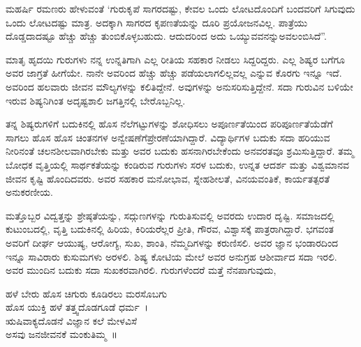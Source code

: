 {ಮಹರ್ಷಿ ರಮಣರು ಹೇಳುವಂತೆ ‘ಗುರುಕೃಪೆ ಸಾಗರದಷ್ಟು, ಕೇವಲ ಒಂದು ಲೋಟದೊಂದಿಗೆ ಬಂದವರಿಗೆ ಸಿಗುವುದು ಒಂದು ಲೋಟದಷ್ಟು ಮಾತ್ರ. ಅದಕ್ಕಾಗಿ ಸಾಗರದ ಕೃಪಣತೆಯನ್ನು ದೂರಿ ಪ್ರಯೋಜನವಿಲ್ಲ. ಪಾತ್ರೆಯು ದೊಡ್ಡದಾದಷ್ಟೂ ಹೆಚ್ಚು ಹೆಚ್ಚು ತುಂಬಿಕೊಳ್ಳಬಹುದು. ಆದುದರಿಂದ ಅದು ಒಯ್ಯುವವನನ್ನು\break ಅವಲಂಬಿಸಿದೆ”.

ಮಾತೃ ಹೃದಯಿ ಗುರುಗಳು ನನ್ನ ಉನ್ನತಿಗಾಗಿ ಎಲ್ಲ ರೀತಿಯ ಸಹಕಾರ ನೀಡಲು ಸಿದ್ದರಿದ್ದರು. ಎಲ್ಲ ಶಿಷ್ಯರ ಬಗೆಗೂ ಅವರ ಜಾಗ್ರತೆ ಹೀಗೆಯೇ. ನಾನೇ ಅವರಿಂದ ಹೆಚ್ಚು ಹೆಚ್ಚು ಪಡೆಯಲಾಗಲಿಲ್ಲವಲ್ಲ ಎನ್ನುವ ಕೊರಗು ಇನ್ನೂ ಇದೆ. ಅವರಿಂದ ಹಲವಾರು ಜೀವನ ಮೌಲ್ಯಗಳನ್ನು ಕಲಿತಿದ್ದೇನೆ. ಅವುಗಳನ್ನು ಅನುಸರಿಸುತ್ತಿದ್ದೇನೆ. ಸದಾ ಗುರುವಿನ ಬಳಿಯೇ ಇರುವ ಶಿಷ್ಯನಿಗಿಂತ ಅದೃಷ್ಟಶಾಲಿ ಜಗತ್ತಿನಲ್ಲಿ ಬೇರೊಬ್ಬನಿಲ್ಲ.

ತನ್ನ ಶಿಷ್ಯರುಗಳಿಗೆ ಬದುಕಿನಲ್ಲಿ ಹೊಸ ನೆಲೆಗಟ್ಟುಗಳನ್ನು ಶೋಧಿಸಲು ಅಪೂರ್ಣತೆ\-ಯಿಂದ ಪರಿಪೂರ್ಣತೆಯೆಡೆಗೆ ಸಾಗಲು ಹೊಸ ಹೊಸ ಚಿಂತನಗಳ ಅನ್ವೇಷಣೆಗೆ\break ಪ್ರೇರಣೆಯಾಗಿದ್ದಾರೆ. ವಿದ್ಯಾರ್ಥಿಗಳ ಬದುಕು ಸದಾ ಹರಿಯುವ ನೀರಿನಂತೆ ಚಲನಶೀಲ\-ವಾಗಿರಬೇಕು ಮತ್ತು ಅವರ ಬದುಕು ಹಸನಾಗಿರಬೇಕೆಂದು ಅನವರತವೂ ಶ್ರಮಿಸುತ್ತಿದ್ದಾರೆ. ತಮ್ಮ ಬೋಧಕ ವೃತ್ತಿಯಲ್ಲಿ ಸಾರ್ಥಕತೆಯನ್ನು ಕಂಡಿರುವ ಗುರುಗಳು ಸರಳ ಬದುಕು, ಉನ್ನತ ಆದರ್ಶ ಮತ್ತು ವಿಶ್ವಮಾನವ ಜೀವನ ಕೃಷ್ಟಿ ಹೊಂದಿದವರು. ಅವರ ಸಹಕಾರ ಮನೋಭಾವ, ಸ್ನೇಹಶೀಲತೆ, ವಿನಯವಂತಿಕೆ, ಕಾರ್ಯತತ್ಪರತೆ ಅನುಕರಣೀಯ.

ಮತ್ತೊಬ್ಬರ ವಿದ್ವತ್ತನ್ನು ಶ್ರೇಷ್ಠತೆಯನ್ನು, ಸದ್ಗುಣಗಳನ್ನು ಗುರುತಿಸುವಲ್ಲಿ ಅವರದು ಉದಾರ ದೃಷ್ಟಿ. ಸಮಾಜದಲ್ಲಿ ಕುಟುಂಬದಲ್ಲಿ, ವೃತ್ತಿ ಬದುಕಿನಲ್ಲಿ ಹಿರಿಯ, ಕಿರಿಯರೆಲ್ಲರ ಪ್ರೀತಿ, ಗೌರವ, ವಿಶ್ವಾಸಕ್ಕೆ ಪಾತ್ರರಾಗಿದ್ದಾರೆ. ಭಗವಂತ ಅವರಿಗೆ ದೀರ್ಘ ಆಯುಷ್ಯ, ಆರೋಗ್ಯ, ಸುಖ, ಶಾಂತಿ, ನೆಮ್ಮದಿಗಳನ್ನು ಕರುಣಿಸಲಿ. ಅವರ ಜ್ಞಾನ ಭಂಡಾರದಿಂದ ಇನ್ನೂ ಸಾವಿರಾರು ಕುಸುಮಗಳು ಅರಳಲಿ. ಶಿಷ್ಯ ಕೋಟಿಯ ಮೇಲೆ ಅವರ ಅನುಗ್ರಹ ಆಶೀರ್ವಾದ ಸದಾ ಇರಲಿ. ಅವರ ಮುಂದಿನ ಬದುಕು ಸದಾ ಸುಖ\-ಕರ\-ವಾಗಿರಲಿ. ಗುರುಗಳೆಂದರೆ ಮತ್ತೆ ನೆನಪಾಗುವುದು,
\begin{center}
ಹಳೆ ಬೇರು ಹೊಸ ಚಿಗುರು ಕೂಡಿರಲು ಮರಸೊಬಗು\\
ಹೊಸ ಯುಕ್ತಿ ಹಳೆ ತತ್ತ್ವದೊಡಗೂಡೆ ಧರ್ಮ~।\\
ಋಷಿವಾಕ್ಯದೊಡನೆ ವಿಜ್ಞಾನ ಕಲೆ ಮೇಳವಿಸೆ \\
ಅಸವು ಜನಜೀವನಕೆ   \enginline{-}   ಮಂಕುತಿಮ್ಮ~॥
\end{center}

\articleend
}
